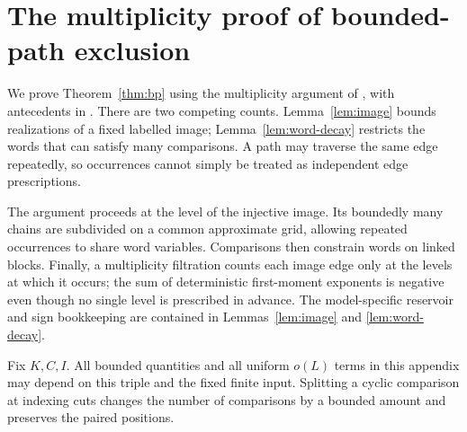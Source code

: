 \section{The multiplicity proof of bounded-path exclusion}\label{app:bp}
We prove Theorem~\ref{thm:bp} using the multiplicity argument of \cite[Section~4; source file \texttt{patterns.tex}]{OAI197a}, with antecedents in \cite{Oll05}. There are two competing counts. Lemma~\ref{lem:image} bounds realizations of a fixed labelled image; Lemma~\ref{lem:word-decay} restricts the words that can satisfy many comparisons. A path may traverse the same edge repeatedly, so occurrences cannot simply be treated as independent edge prescriptions.

The argument proceeds at the level of the injective image. Its boundedly many chains are subdivided on a common approximate grid, allowing repeated occurrences to share word variables. Comparisons then constrain words on linked blocks. Finally, a multiplicity filtration counts each image edge only at the levels at which it occurs; the sum of deterministic first-moment exponents is negative even though no single level is prescribed in advance. The model-specific reservoir and sign bookkeeping are contained in Lemmas~\ref{lem:image} and \ref{lem:word-decay}.

Fix $K,C,I$. All bounded quantities and all uniform $o(L)$ terms in this appendix may depend on this triple and the fixed finite input. Splitting a cyclic comparison at indexing cuts changes the number of comparisons by a bounded amount and preserves the paired positions.

